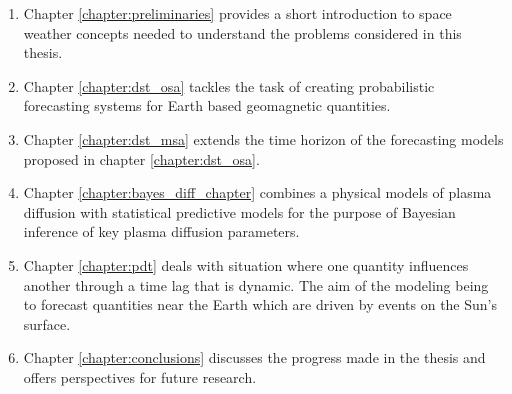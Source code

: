 \begin{enumerate}
    \item Chapter \ref{chapter:preliminaries} provides a short introduction to space weather concepts needed to 
    understand the problems considered in this thesis.
    \item Chapter \ref{chapter:dst_osa} tackles the task of creating probabilistic forecasting systems for Earth 
    based geomagnetic quantities.
    \item Chapter \ref{chapter:dst_msa} extends the time horizon of the forecasting models proposed in chapter 
    \ref{chapter:dst_osa}.
    \item Chapter \ref{chapter:bayes_diff_chapter} combines a physical models of plasma diffusion with 
    statistical predictive models for the purpose of Bayesian inference of key plasma diffusion parameters.
    \item Chapter \ref{chapter:pdt} deals with situation where one quantity influences another through a 
    time lag that is dynamic. The aim of the modeling being to forecast quantities near the Earth which 
    are driven by events on the Sun's surface. 
    \item Chapter \ref{chapter:conclusions} discusses the progress made in the thesis and offers perspectives 
    for future research.
\end{enumerate}

\clearpage


